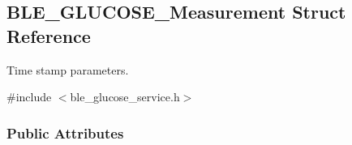 \hypertarget{struct_b_l_e___g_l_u_c_o_s_e___measurement}{}\subsection{B\+L\+E\+\_\+\+G\+L\+U\+C\+O\+S\+E\+\_\+\+Measurement Struct Reference}
\label{struct_b_l_e___g_l_u_c_o_s_e___measurement}


Time stamp parameters.  




{\ttfamily \#include $<$ble\+\_\+glucose\+\_\+service.\+h$>$}

\subsubsection*{Public Attributes}
